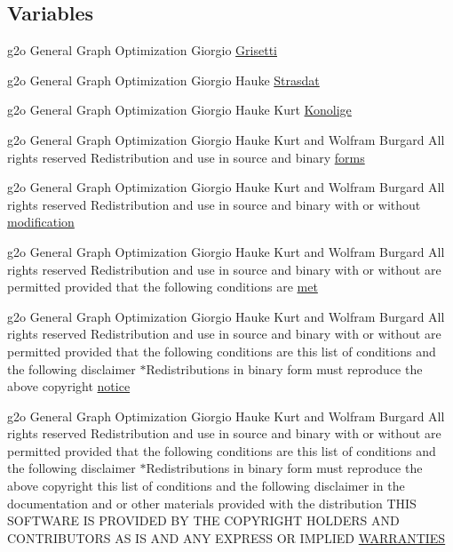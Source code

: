 \subsection*{Variables}
\begin{DoxyCompactItemize}
\item 
g2o General Graph Optimization Giorgio \hyperlink{license-bsd_8txt_aae7062157d7e4ac6870ccd09c39484b8}{Grisetti}
\item 
g2o General Graph Optimization Giorgio Hauke \hyperlink{license-bsd_8txt_a0d2375d81ba004404281c3e070f2504a}{Strasdat}
\item 
g2o General Graph Optimization Giorgio Hauke Kurt \hyperlink{license-bsd_8txt_af76ecd2524130a4347b552d1e153dc48}{Konolige}
\item 
g2o General Graph Optimization Giorgio Hauke Kurt and Wolfram Burgard All rights reserved Redistribution and use in source and binary \hyperlink{license-bsd_8txt_afd7452e1adeebc76058f8da6434ba7a3}{forms}
\item 
g2o General Graph Optimization Giorgio Hauke Kurt and Wolfram Burgard All rights reserved Redistribution and use in source and binary with or without \hyperlink{license-bsd_8txt_a14fe16b9775a279c08ad78dbfbc7018e}{modification}
\item 
g2o General Graph Optimization Giorgio Hauke Kurt and Wolfram Burgard All rights reserved Redistribution and use in source and binary with or without are permitted provided that the following conditions are \hyperlink{license-bsd_8txt_ab354ff6dcd2abd4ceb3819d4944db7be}{met}
\item 
g2o General Graph Optimization Giorgio Hauke Kurt and Wolfram Burgard All rights reserved Redistribution and use in source and binary with or without are permitted provided that the following conditions are this list of conditions and the following disclaimer $\ast$Redistributions in binary form must reproduce the above copyright \hyperlink{license-bsd_8txt_a23684e2ec92c6cfdb0e3a78bbaa15a16}{notice}
\item 
g2o General Graph Optimization Giorgio Hauke Kurt and Wolfram Burgard All rights reserved Redistribution and use in source and binary with or without are permitted provided that the following conditions are this list of conditions and the following disclaimer $\ast$Redistributions in binary form must reproduce the above copyright this list of conditions and the following disclaimer in the documentation and or other materials provided with the distribution T\+H\+IS S\+O\+F\+T\+W\+A\+RE IS P\+R\+O\+V\+I\+D\+ED BY T\+HE C\+O\+P\+Y\+R\+I\+G\+HT H\+O\+L\+D\+E\+RS A\+ND C\+O\+N\+T\+R\+I\+B\+U\+T\+O\+RS AS IS A\+ND A\+NY E\+X\+P\+R\+E\+SS OR I\+M\+P\+L\+I\+ED \hyperlink{license-bsd_8txt_aada97a6c44c9b8b4b0cfb3a641d0fe51}{W\+A\+R\+R\+A\+N\+T\+I\+ES}

\end{DoxyCompactItemize}
